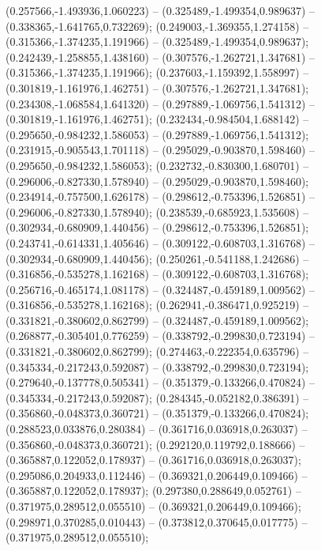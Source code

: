  (0.257566,-1.493936,1.060223) -- (0.325489,-1.499354,0.989637) -- (0.338365,-1.641765,0.732269);
 (0.249003,-1.369355,1.274158) -- (0.315366,-1.374235,1.191966) -- (0.325489,-1.499354,0.989637);
 (0.242439,-1.258855,1.438160) -- (0.307576,-1.262721,1.347681) -- (0.315366,-1.374235,1.191966);
 (0.237603,-1.159392,1.558997) -- (0.301819,-1.161976,1.462751) -- (0.307576,-1.262721,1.347681);
 (0.234308,-1.068584,1.641320) -- (0.297889,-1.069756,1.541312) -- (0.301819,-1.161976,1.462751);
 (0.232434,-0.984504,1.688142) -- (0.295650,-0.984232,1.586053) -- (0.297889,-1.069756,1.541312);
 (0.231915,-0.905543,1.701118) -- (0.295029,-0.903870,1.598460) -- (0.295650,-0.984232,1.586053);
 (0.232732,-0.830300,1.680701) -- (0.296006,-0.827330,1.578940) -- (0.295029,-0.903870,1.598460);
 (0.234914,-0.757500,1.626178) -- (0.298612,-0.753396,1.526851) -- (0.296006,-0.827330,1.578940);
 (0.238539,-0.685923,1.535608) -- (0.302934,-0.680909,1.440456) -- (0.298612,-0.753396,1.526851);
 (0.243741,-0.614331,1.405646) -- (0.309122,-0.608703,1.316768) -- (0.302934,-0.680909,1.440456);
 (0.250261,-0.541188,1.242686) -- (0.316856,-0.535278,1.162168) -- (0.309122,-0.608703,1.316768);
 (0.256716,-0.465174,1.081178) -- (0.324487,-0.459189,1.009562) -- (0.316856,-0.535278,1.162168);
 (0.262941,-0.386471,0.925219) -- (0.331821,-0.380602,0.862799) -- (0.324487,-0.459189,1.009562);
 (0.268877,-0.305401,0.776259) -- (0.338792,-0.299830,0.723194) -- (0.331821,-0.380602,0.862799);
 (0.274463,-0.222354,0.635796) -- (0.345334,-0.217243,0.592087) -- (0.338792,-0.299830,0.723194);
 (0.279640,-0.137778,0.505341) -- (0.351379,-0.133266,0.470824) -- (0.345334,-0.217243,0.592087);
 (0.284345,-0.052182,0.386391) -- (0.356860,-0.048373,0.360721) -- (0.351379,-0.133266,0.470824);
 (0.288523,0.033876,0.280384) -- (0.361716,0.036918,0.263037) -- (0.356860,-0.048373,0.360721);
 (0.292120,0.119792,0.188666) -- (0.365887,0.122052,0.178937) -- (0.361716,0.036918,0.263037);
 (0.295086,0.204933,0.112446) -- (0.369321,0.206449,0.109466) -- (0.365887,0.122052,0.178937);
 (0.297380,0.288649,0.052761) -- (0.371975,0.289512,0.055510) -- (0.369321,0.206449,0.109466);
 (0.298971,0.370285,0.010443) -- (0.373812,0.370645,0.017775) -- (0.371975,0.289512,0.055510);
